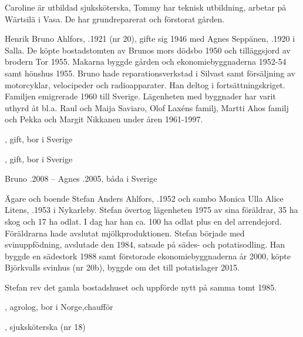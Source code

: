 Caroline är utbildad sjuksköterska, Tommy har teknisk utbildning, arbetar på Wärtsilä i Vasa. De har grundreparerat och förstorat gården.
\begin{jhchildren}
  \item {}
  \item {}
\end{jhchildren}


Henrik Bruno Ahlfors, .1921 (nr 20), gifte sig 1946 med Agnes Seppänen, .1920 i Salla.  De köpte bostadstomten av Brunos mors dödsbo 1950 och tilläggsjord av brodern Tor 1955. Makarna byggde gården och ekonomiebyggnaderna 1952-54 samt hönshus 1955. Bruno hade reparationsverkstad i Silvast samt försäljning av motorcyklar, velocipeder och radioapparater.  Han deltog i fortsättningskriget. Familjen emigrerade 1960 till Sverige.  Lägenheten med byggnader har varit uthyrd  åt bl.a. Raul och Maija Saviaro, Olof Laxéns familj, Martti Ahos familj och Pekka och Margit Nikkanen under åren 1961-1997.
\begin{jhchildren}
  \item {}, gift, bor i Sverige
  \item {}, gift, bor i Sverige
\end{jhchildren}
Bruno .2008  --  Agnes .2005, båda i Sverige




Ägare och boende Stefan Anders Ahlfors, .1952 och sambo Monica Ulla Alice Litens, .1953 i Nykarleby. Stefan övertog lägenheten 1975 av sina föräldrar, 35 ha skog och 17 ha odlat. I dag har han ca. 100 ha odlat plus en del arrendejord.  Föräldrarna hade avslutat mjölkproduktionen. Stefan började med svinuppfödning, avslutade den 1984, satsade på sädes- och potatisodling. Han byggde en sädestork 1988 samt förstorade ekonomiebyggnaderna  år 2000, köpte Björkvalls svinhus (nr 20b), byggde om det till potatislager 2015.


Stefan rev det gamla bostadshuset och uppförde nytt på samma tomt 1985.
\begin{jhchildren}
  \item {}, agrolog, bor i Norge,chaufför
  \item {}, sjuksköterska (nr 18)
\end{jhchildren}


